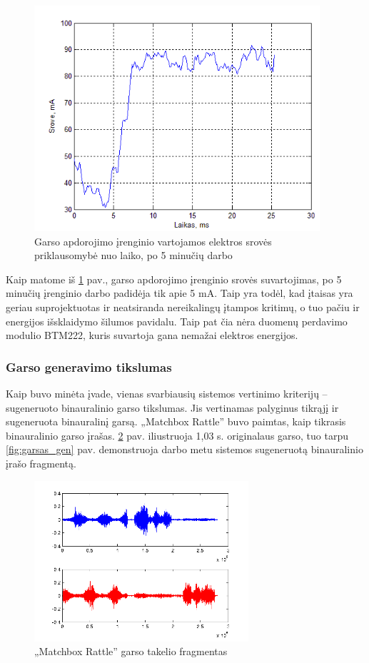 \documentclass[]{vgtuef}
\begin{document}
{\begin{figure}[htbp]
  \centering
  \includegraphics[width=400px]{img/sound_energy_5min.png}
  \caption{Garso apdorojimo įrenginio vartojamos elektros srovės priklausomybė nuo laiko, po 5 minučių darbo}
  \label{fig:sound_energy_5min}
\end{figure}

Kaip matome iš \ref{fig:sound_energy_5min} pav., garso apdorojimo įrenginio srovės suvartojimas, po 5 minučių įrenginio darbo padidėja tik apie 5 mA. Taip yra todėl, kad įtaisas yra geriau suprojektuotas ir neatsiranda nereikalingų įtampos kritimų, o tuo pačiu ir energijos išsklaidymo šilumos pavidalu. Taip pat čia nėra duomenų perdavimo modulio BTM222, kuris suvartoja gana nemažai elektros energijos.

\newpage

\subsubsection{Garso generavimo tikslumas}

Kaip buvo minėta įvade, vienas svarbiausių sistemos vertinimo kriterijų -- sugeneruoto binauralinio garso tikslumas. Jis vertinamas palyginus tikrąjį ir sugeneruota binauralinį garsą. „Matchbox Rattle'' buvo paimtas, kaip tikrasis binauralinio garso įrašas. \ref{fig:garsas_orig} pav. iliustruoja 1,03 s. originalaus garso, tuo tarpu \ref{fig:garsas_gen} pav. demonstruoja darbo metu sistemos sugeneruotą binauralinio įrašo fragmentą.

\begin{figure}[ht]
  \centering
  \includegraphics[width=300px]{img/garsas_originalus.png}
  \caption{„Matchbox Rattle'' garso takelio fragmentas}
  \label{fig:garsas_orig}
\end{figure}

}
\end{document}
